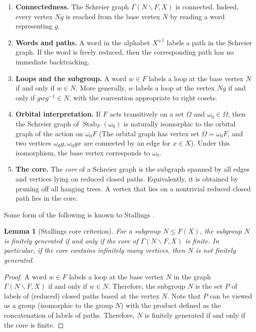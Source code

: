 \documentclass[]{amsart}
\newtheorem*{fixed point criterion}{\fixed point criterion}
\newtheorem{lem}[thm]{Lemma}
\theoremstyle{definition}
\theoremstyle{remark}
\numberwithin{equation}{section}
\newcommand{\Stab}{\operatorname{Stab}}
\begin{document}
\begin{enumerate}[label=\textbf{S\arabic*.}, leftmargin=2.4em]
\item \textbf{Connectedness.}
The Schreier graph $\Gamma(N\backslash F,X)$ is connected.  Indeed, every
vertex $Ng$ is reached from the base vertex $N$ by reading a word representing
$g$.

\item \textbf{Words and paths.}
A word in the alphabet $X^{\pm1}$ labels a path in the Schreier graph.  If the
word is freely reduced, then the corresponding path has no immediate
backtracking.

\item \textbf{Loops and the subgroup.}
A word $w\in F$ labels a loop at the base vertex $N$ if and only if $w\in N$.
More generally, $w$ labels a loop at the vertex $Ng$ if and only if
$gwg^{-1}\in N$, with the convention appropriate to right cosets.

\item \textbf{Orbital interpretation.}
If $F$ acts transitively on a set $\Omega$ and $\omega_0\in \Omega$, then the
Schreier graph of $\Stab_F(\omega_0)$ is naturally isomorphic to the orbital
graph of the action on $\omega_0 F$ (The orbital graph has vertex set $\Omega=\omega_0 F$, and two vertices $\omega_0 g,\omega_0 gx$ are connected by an edge for $x\in X$).  Under this isomorphism, the base vertex
corresponds to $\omega_0$.

\item \textbf{The core.}
The \emph{core} of a Schreier graph is the subgraph spanned by all edges and
vertices lying on reduced closed paths.  Equivalently, it is obtained by
pruning off all hanging trees.  A vertex that lies on a nontrivial reduced
closed path lies in the core.

\end{enumerate}
Some form of the following is known to Stallings \cite{Stallings1983}.

\begin{lem}[Stallings core criterion]\label{Stallings core
criterion}
    For a subgroup $N\leq F(X)$, the subgroup $N$ is finitely generated if and only
if the core of $\Gamma(N\backslash F,X)$ is finite.  In particular, if the core
contains infinitely many vertices, then $N$ is not finitely generated.
\end{lem}
\begin{proof}
    A word $w\in F$ labels a loop at the base vertex $N$ in the graph $\Gamma(N\backslash F,X)$  if and only if $w\in N$. Therefore, the subgroup $N$ is the set $P$ of labels of (reduced) closed paths based at the vertex $N$.  Note that $P$ can be viewed as a group (isomorphic to the group $N$) with the product defined as the concatenation of labels of paths. Therefore, $N$ is finitely generated if and only if the core is finite.
\end{proof}
\end{document}

